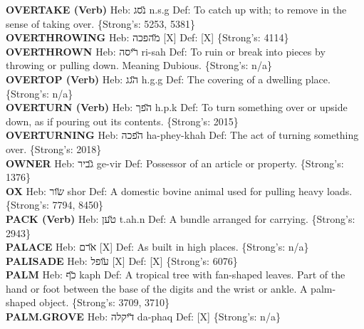 {\textbf{OVERTAKE (Verb)} Heb: {\large\H נסג} n.s.g Def: To catch up with; to remove in the sense of taking over. \{Strong's: 5253, 5381\}\hfill{}\\

\textbf{OVERTHROWING} Heb: {\large\H מהפכה} {[}X{]} Def: {[}X{]} \{Strong's: 4114\}\hfill{}\\

\textbf{OVERTHROWN} Heb: {\large\H ריסה} ri-sah Def: To ruin or break into pieces by throwing or pulling down. Meaning Dubious. \{Strong's: n/a\}\hfill{}\\

\textbf{OVERTOP (Verb)} Heb: {\large\H הגג} h.g.g Def: The covering of a dwelling place. \{Strong's: n/a\}\hfill{}\\

\textbf{OVERTURN (Verb)} Heb: {\large\H הפך} h.p.k Def: To turn something over or upside down, as if pouring out its contents. \{Strong's: 2015\}\hfill{}\\

\textbf{OVERTURNING} Heb: {\large\H הפכה} ha-phey-khah Def: The act of turning something over. \{Strong's: 2018\}\hfill{}\\

\textbf{OWNER} Heb: {\large\H גביר} ge-vir Def: Possessor of an article or property. \{Strong's: 1376\}\hfill{}\\

\textbf{OX} Heb: {\large\H שור} shor Def: A domestic bovine animal used for pulling heavy loads. \{Strong's: 7794, 8450\}\hfill{}\\

\textbf{PACK (Verb)} Heb: {\large\H טען} t.ah.n Def: A bundle arranged for carrying. \{Strong's: 2943\}\hfill{}\\

\textbf{PALACE} Heb: {\large\H ארם} {[}X{]} Def: As built in high places. \{Strong's: n/a\}\hfill{}\\

\textbf{PALISADE} Heb: {\large\H עופל} {[}X{]} Def: {[}X{]} \{Strong's: 6076\}\hfill{}\\

\textbf{PALM} Heb: {\large\H כף} kaph Def: A tropical tree with fan-shaped leaves. Part of the hand or foot between the base of the digits and the wrist or ankle. A palm-shaped object. \{Strong's: 3709, 3710\}\hfill{}\\

\textbf{PALM.GROVE} Heb: {\large\H דיקלה} da-phaq Def: {[}X{]} \{Strong's: n/a\}\hfill{}\\

}
